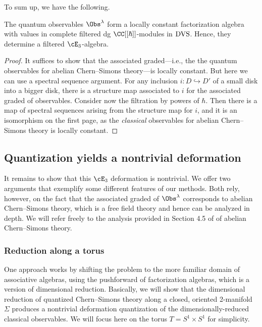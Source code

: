 \documentclass[10pt]{amsart}
\begin{document}
To sum up, we have the following.

\begin{lmm}
The quantum observables $\Obs^\lambda$ form a locally constant factorization algebra with values in complete filtered dg $\CC[[\hbar]]$-modules in ${\rm DVS}$.
Hence, they determine a filtered $\cE_3$-algebra.
\end{lmm}

\begin{proof}
It suffices to show that the associated graded---i.e., the the quantum observables for abelian Chern--Simons theory---is locally constant.
But here we can use a spectral sequence argument. 
For any inclusion $i: D \hookrightarrow D'$ of a small disk into a bigger disk,
there is a structure map associated to $i$ for the associated graded of observables.
Consider now the filtration by powers of $\hbar$.
Then there is a map of spectral sequences arising from the structure map for $i$,
and it is an isomorphism on the first page, as the {\em classical} observables for abelian Chern--Simons theory is locally constant.
\end{proof}

\subsection{Quantization yields a nontrivial deformation}
\label{subsec: nontrivial def}

It remains to show that this $\cE_3$ deformation is nontrivial.
We offer two arguments that exemplify some different features of our methods.
Both rely, however, on the fact that the associated graded of $\Obs^\lambda$ corresponds to abelian Chern--Simons theory,
which is a free field theory and hence can be analyzed in depth.
We will refer freely to the analysis provided in Section 4.5 of \cite{CG1} of abelian Chern--Simons theory.

\subsubsection{Reduction along a torus}

One approach works by shifting the problem to the more familiar domain of associative algebras,
using the pushforward of factorization algebras, 
which is a version of dimensional reduction.
Basically, we will show that the dimensional reduction of quantized Chern--Simons theory 
along a closed, oriented 2-manifold $\Sigma$ 
produces a nontrivial deformation quantization of the dimensionally-reduced classical observables.
We will focus here on the torus $T = S^1 \times S^1$ for simplicity.
\end{document}
